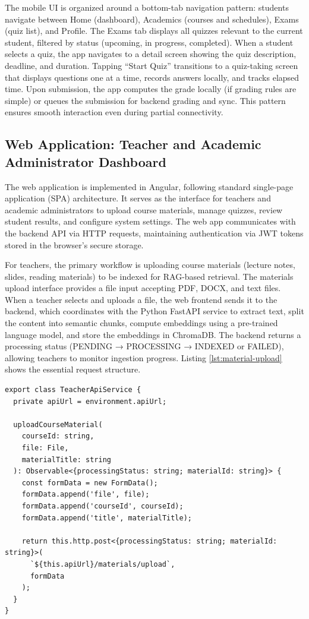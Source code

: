 \documentclass[a4paper,9pt,twocolumn]{extarticle}
\begin{document}
The mobile UI is organized around a bottom-tab navigation pattern: students navigate between Home (dashboard), Academics (courses and schedules), Exams (quiz list), and Profile. The Exams tab displays all quizzes relevant to the current student, filtered by status (upcoming, in progress, completed). When a student selects a quiz, the app navigates to a detail screen showing the quiz description, deadline, and duration. Tapping ``Start Quiz'' transitions to a quiz-taking screen that displays questions one at a time, records answers locally, and tracks elapsed time. Upon submission, the app computes the grade locally (if grading rules are simple) or queues the submission for backend grading and sync. This pattern ensures smooth interaction even during partial connectivity.

\subsection{Web Application: Teacher and Academic Administrator Dashboard}
\label{sec:impl:web}

The web application is implemented in Angular, following standard single-page application (SPA) architecture. It serves as the interface for teachers and academic administrators to upload course materials, manage quizzes, review student results, and configure system settings. The web app communicates with the backend API via HTTP requests, maintaining authentication via JWT tokens stored in the browser's secure storage.

For teachers, the primary workflow is uploading course materials (lecture notes, slides, reading materials) to be indexed for RAG-based retrieval. The materials upload interface provides a file input accepting PDF, DOCX, and text files. When a teacher selects and uploads a file, the web frontend sends it to the backend, which coordinates with the Python FastAPI service to extract text, split the content into semantic chunks, compute embeddings using a pre-trained language model, and store the embeddings in ChromaDB. The backend returns a processing status (PENDING → PROCESSING → INDEXED or FAILED), allowing teachers to monitor ingestion progress. Listing \ref{lst:material-upload} shows the essential request structure.

\begin{verbatim}
export class TeacherApiService {
  private apiUrl = environment.apiUrl;
  
  uploadCourseMaterial(
    courseId: string,
    file: File,
    materialTitle: string
  ): Observable<{processingStatus: string; materialId: string}> {
    const formData = new FormData();
    formData.append('file', file);
    formData.append('courseId', courseId);
    formData.append('title', materialTitle);
    
    return this.http.post<{processingStatus: string; materialId: string}>(
      `${this.apiUrl}/materials/upload`,
      formData
    );
  }
}
\end{verbatim}
\label{lst:material-upload}
\end{document}

